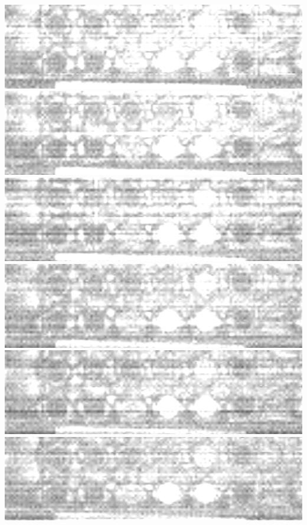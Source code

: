 \documentclass{beamer}
\begin{document}
\begin{frame}
        \includegraphics[height=0.023\textheight]{spatial-denoised/wavelet_den_13.png}
        \includegraphics[height=0.023\textheight]{spatial-denoised/wavelet_den_14.png}
        \includegraphics[height=0.023\textheight]{spatial-denoised/wavelet_den_15.png}\\
        \includegraphics[height=0.023\textheight]{spatial-denoised/wavelet_den_16.png}
        \includegraphics[height=0.023\textheight]{spatial-denoised/wavelet_den_17.png}
        \includegraphics[height=0.023\textheight]{spatial-denoised/wavelet_den_18.png}

\end{frame}
\end{document}
